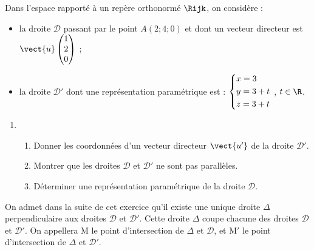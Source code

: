 Dans l'espace rapporté à un repère orthonormé $\Rijk$, on considère :
%
\begin{itemize}
	\item la droite $\mathcal{D}$ passant par le point $A(2;4;0)$ et dont un vecteur directeur est $\vect{u}\begin{pmatrix}1\\2\\0\end{pmatrix}$ ;
	\item la droite $\mathcal{D}'$ dont une représentation paramétrique est : $\begin{dcases}x=3\\y=3 + t\\z=3 + t \end{dcases}$ \:, $t \in \R$.
\end{itemize}

\begin{enumerate}
	\item 
	\begin{enumerate}
		\item Donner les coordonnées d'un vecteur directeur $\vect{u'}$ de la droite $\mathcal{D}'$.
		\item Montrer que les droites $\mathcal{D}$ et $\mathcal{D}'$ ne sont pas parallèles.
		\item Déterminer une représentation paramétrique de la droite $\mathcal{D}$.
	\end{enumerate}
\end{enumerate}

On admet dans la suite de cet exercice qu'il existe une unique droite $\Delta$ perpendiculaire aux droites $\mathcal{D}$ et $\mathcal{D}'$. Cette droite $\Delta$ coupe chacune des droites $\mathcal{D}$ et $\mathcal{D}'$. On appellera M le point d'intersection de $\Delta$ et $\mathcal{D}$, et M$'$ le point d'intersection de $\Delta$ et $\mathcal{D}'$.

